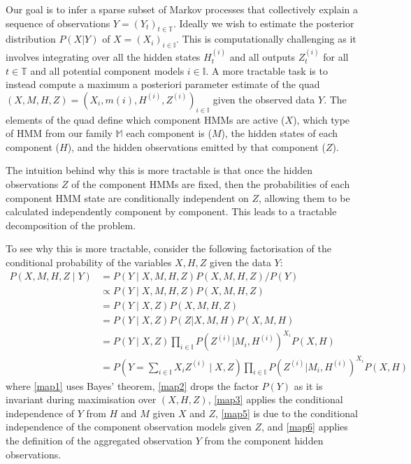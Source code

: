 \documentclass[twoside, 11pt]{article}
\newcommand{\mm}[0] {\mathbb{M}} %
\newcommand{\TT}[0] {\mathbb{T}} %
\newcommand{\II}[0] {\mathbb{I}} %
\newcommand{\traj}[1] {H^{(#1)}}
\newcommand{\state}[2] {H_{#2}^{(#1)}}
\newcommand{\event}[2] {Z_{#2}^{(#1)}}
\newcommand{\eventseq}[1] {Z^{(#1)}}
\begin{document}
Our goal is to infer a sparse subset of Markov processes that collectively explain a sequence of observations $Y = (Y_t)_{t \in \TT}$. Ideally we wish to estimate the posterior distribution $P(X | Y)$ of $X = (X_i)_{i \in \II}$. This is computationally challenging as it involves integrating over all the hidden states $\state i t$ and all outputs $\event i t$ for all $t \in \TT$ and all potential component models $i \in \II$. A more tractable task is to instead compute a maximum a posteriori parameter estimate of the quad $(X, M, H, Z) = (X_i, m(i), \traj i, Z^{(i)})_{i \in \II}$ given the observed data $Y$. The elements of the quad define which component HMMs are active ($X$), which type of HMM from our family $\mm$ each component is ($M$), the hidden states of each component ($H$), and the hidden observations emitted by that component ($Z$).

The intuition behind why this is more tractable is that once the hidden observations $Z$ of the component HMMs are fixed, then the probabilities of each component HMM state are conditionally independent on $Z$, allowing them to be calculated independently component by component. This leads to a tractable decomposition of the problem. 

To see why this is more tractable, consider the following factorisation of the conditional probability of the variables $X, H, Z$ given the data $Y$:
\begin{align}
P(X, M, H, Z \mid Y)
& = P(Y \mid X, M, H, Z) P(X, M, H, Z) / P(Y) \label{map1} \\
& \propto P(Y \mid X, M, H, Z) P(X, M, H, Z) \label{map2} \\
& = P(Y \mid X, Z) P(X, M, H, Z) \label{map3} \\
& = P(Y \mid X, Z) P(Z | X, M, H) P(X, M, H) \label{map4} \\
& = P\left(Y \mid X, Z\right) \prod_{i \in \II} P\left(\eventseq i | M_i, \traj i\right)^{X_i} P(X, H) \label{map5} \\
& = P\left(Y = \sum_{i \in \II} X_i \eventseq i \mid X, Z \right)
\prod_{i \in \II} P\left(\eventseq i | M_i, \traj i\right)^{X_i} P(X, H) \label{map6}
\end{align}
where \ref{map1} uses Bayes' theorem, \ref{map2} drops the factor $P(Y)$ as it is invariant during maximisation over $(X, H, Z)$, \ref{map3} applies the conditional independence of $Y$ from $H$ and $M$ given $X$ and $Z$, \ref{map5} is due to the conditional independence of the component observation models given $Z$, and \ref{map6} applies the definition of the aggregated observation $Y$ from the component hidden observations.
\end{document}

